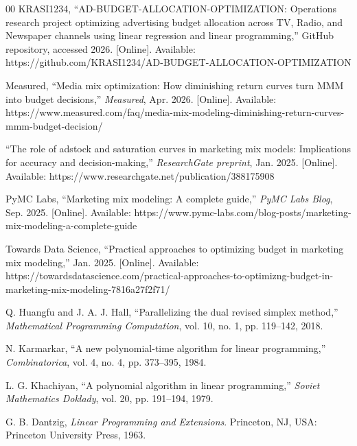 \documentclass[conference]{IEEEtran}
\begin{document}
\begin{thebibliography}{00}
 KRASI1234, ``AD-BUDGET-ALLOCATION-OPTIMIZATION: Operations research project optimizing advertising budget allocation across TV, Radio, and Newspaper channels using linear regression and linear programming,'' GitHub repository, accessed 2026. [Online]. Available: https://github.com/KRASI1234/AD-BUDGET-ALLOCATION-OPTIMIZATION

 Measured, ``Media mix optimization: How diminishing return curves turn MMM into budget decisions,'' \emph{Measured}, Apr. 2026. [Online]. Available: https://www.measured.com/faq/media-mix-modeling-diminishing-return-curves-mmm-budget-decision/

 ``The role of adstock and saturation curves in marketing mix models: Implications for accuracy and decision-making,'' \emph{ResearchGate preprint}, Jan. 2025. [Online]. Available: https://www.researchgate.net/publication/388175908

 PyMC Labs, ``Marketing mix modeling: A complete guide,'' \emph{PyMC Labs Blog}, Sep. 2025. [Online]. Available: https://www.pymc-labs.com/blog-posts/marketing-mix-modeling-a-complete-guide

 Towards Data Science, ``Practical approaches to optimizing budget in marketing mix modeling,'' Jan. 2025. [Online]. Available: https://towardsdatascience.com/practical-approaches-to-optimizng-budget-in-marketing-mix-modeling-7816a27f2f71/

 Q. Huangfu and J. A. J. Hall, ``Parallelizing the dual revised simplex method,'' \emph{Mathematical Programming Computation}, vol. 10, no. 1, pp. 119--142, 2018.

 N. Karmarkar, ``A new polynomial-time algorithm for linear programming,'' \emph{Combinatorica}, vol. 4, no. 4, pp. 373--395, 1984.

 L. G. Khachiyan, ``A polynomial algorithm in linear programming,'' \emph{Soviet Mathematics Doklady}, vol. 20, pp. 191--194, 1979.

 G. B. Dantzig, \emph{Linear Programming and Extensions}. Princeton, NJ, USA: Princeton University Press, 1963.

\end{thebibliography}
\end{document}
